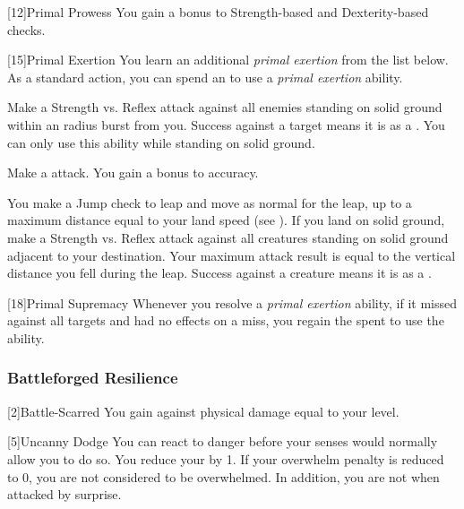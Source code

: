             [12]{Primal Prowess}
            You gain a  bonus to Strength-based and Dexterity-based checks.

            [15]{Primal Exertion}
            You learn an additional \textit{primal exertion} from the list below.
            As a standard action, you can spend an  to use a \textit{primal exertion} ability.
            {
                 Make a Strength vs. Reflex attack against all enemies standing on solid ground within an \areamed radius burst from you.
                Success against a target means it is \stunned as a .
                You can only use this ability while standing on solid ground.

                 Make a  attack.
                You gain a  bonus to accuracy.

                 You make a Jump check to leap and move as normal for the leap, up to a maximum distance equal to your land speed (see ).
                If you land on solid ground, make a Strength vs. Reflex attack against all creatures standing on solid ground adjacent to your destination.
                Your maximum attack result is equal to the vertical distance you fell during the leap.
                Success against a creature means it is \stunned as a .
            }

            [18]{Primal Supremacy}
            Whenever you resolve a \textit{primal exertion} ability, if it missed against all targets and had no effects on a miss, you regain the  spent to use the ability.

        \subsubsection{Battleforged Resilience}
            [2]{Battle-Scarred} You gain  against physical damage equal to your level.

            [5]{Uncanny Dodge} You can react to danger before your senses would normally allow you to do so.
            You reduce your  by 1.
            If your overwhelm penalty is reduced to 0, you are not considered to be overwhelmed.
            In addition, you are not \unaware when attacked by surprise.

